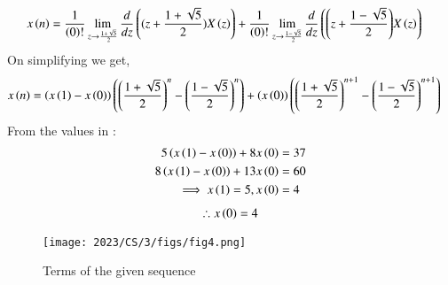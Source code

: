 \documentclass[journal,12pt,onecolumn]{IEEEtran}
\begin{document}
	\begin{align}
		x\left(n\right) &=\frac{1}{\left(0\right)!}\lim\limits_{z\to {\frac{1+\sqrt{5}}{2}}}\frac{d}{dz}\left({(z+\frac{1+\sqrt{5}}{2})}X\left(z\right)\right) + \frac{1}{\left(0\right)!}\lim\limits_{z\to \frac{1-\sqrt{5}}{2}}\frac{d}{dz}\left({\left(z+\frac{1-\sqrt{5}}{2}\right)}X\left(z\right)\right)
	\end{align}
	On simplifying we get,
	\begin{align}
		x\left(n\right) &= \left(x\left(1\right)-x\left(0\right)\right)\left(\left(\frac{1+\sqrt{5}}{2}\right)^n-\left(\frac{1-\sqrt{5}}{2}\right)^n\right) + \left(x\left(0\right)\right)\left(\left(\frac{1+\sqrt{5}}{2}\right)^{n+1}-\left(\frac{1-\sqrt{5}}{2}\right)^{n+1}\right)
	\end{align}
	From the values in :
	\begin{align}
		5 \left(x\left(1\right)-x\left(0\right)\right) + 8 x\left(0\right) &=37\\
		8 \left(x\left(1\right)-x\left(0\right)\right) + 13 x\left(0\right) &=60\\
		\implies x\left(1\right) =5, x\left(0\right) &=4
	\end{align}
	\begin{align}
		\therefore {x\ensuremath{\left(0\right)}=4}
	\end{align}
	\begin{figure}[ht]
		\texttt{[image: 2023/CS/3/figs/fig4.png]}
		\caption{Terms of the given sequence}
		\centering
		\label{fig: fig4}
	\end{figure}
\end{document}
